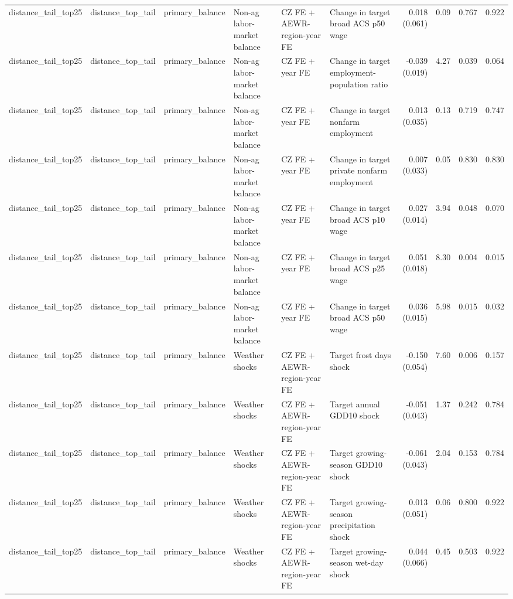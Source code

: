 \begin{tabular}{llllllrrrr}
distance_tail_top25 & distance_top_tail & primary_balance & Non-ag labor-market balance & CZ FE + AEWR-region-year FE & Change in target broad ACS p50 wage & 0.018 (0.061) & 0.09 & 0.767 & 0.922 \\
distance_tail_top25 & distance_top_tail & primary_balance & Non-ag labor-market balance & CZ FE + year FE & Change in target employment-population ratio & -0.039 (0.019) & 4.27 & 0.039 & 0.064 \\
distance_tail_top25 & distance_top_tail & primary_balance & Non-ag labor-market balance & CZ FE + year FE & Change in target nonfarm employment & 0.013 (0.035) & 0.13 & 0.719 & 0.747 \\
distance_tail_top25 & distance_top_tail & primary_balance & Non-ag labor-market balance & CZ FE + year FE & Change in target private nonfarm employment & 0.007 (0.033) & 0.05 & 0.830 & 0.830 \\
distance_tail_top25 & distance_top_tail & primary_balance & Non-ag labor-market balance & CZ FE + year FE & Change in target broad ACS p10 wage & 0.027 (0.014) & 3.94 & 0.048 & 0.070 \\
distance_tail_top25 & distance_top_tail & primary_balance & Non-ag labor-market balance & CZ FE + year FE & Change in target broad ACS p25 wage & 0.051 (0.018) & 8.30 & 0.004 & 0.015 \\
distance_tail_top25 & distance_top_tail & primary_balance & Non-ag labor-market balance & CZ FE + year FE & Change in target broad ACS p50 wage & 0.036 (0.015) & 5.98 & 0.015 & 0.032 \\
distance_tail_top25 & distance_top_tail & primary_balance & Weather shocks & CZ FE + AEWR-region-year FE & Target frost days shock & -0.150 (0.054) & 7.60 & 0.006 & 0.157 \\
distance_tail_top25 & distance_top_tail & primary_balance & Weather shocks & CZ FE + AEWR-region-year FE & Target annual GDD10 shock & -0.051 (0.043) & 1.37 & 0.242 & 0.784 \\
distance_tail_top25 & distance_top_tail & primary_balance & Weather shocks & CZ FE + AEWR-region-year FE & Target growing-season GDD10 shock & -0.061 (0.043) & 2.04 & 0.153 & 0.784 \\
distance_tail_top25 & distance_top_tail & primary_balance & Weather shocks & CZ FE + AEWR-region-year FE & Target growing-season precipitation shock & 0.013 (0.051) & 0.06 & 0.800 & 0.922 \\
distance_tail_top25 & distance_top_tail & primary_balance & Weather shocks & CZ FE + AEWR-region-year FE & Target growing-season wet-day shock & 0.044 (0.066) & 0.45 & 0.503 & 0.922 \\

\end{tabular}
